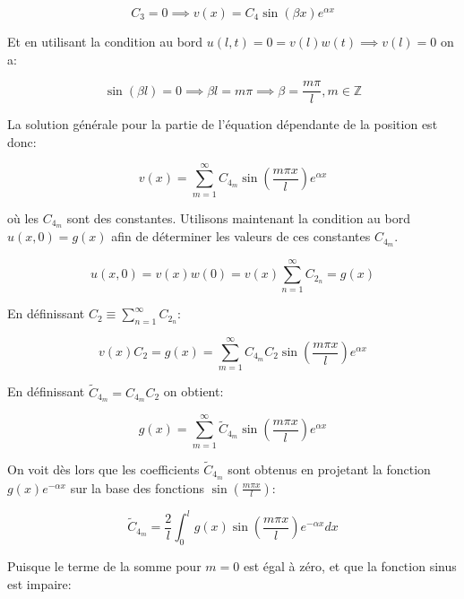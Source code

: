 \documentclass[a4paper, 12pt]{report}
\begin{document}
\begin{equation}
  C_3 = 0 \implies v(x) = C_4 \sin(\beta x) e^{\alpha x}
\end{equation}

Et en utilisant la condition au bord $u(l,t) = 0 = v(l) w(t) \implies v(l) = 0$ on a:

\begin{equation}
  \sin(\beta l) = 0 \implies \beta l = m \pi \implies \beta = \frac{m \pi}{l}, m \in \mathbb{Z}
\end{equation}

La solution générale pour la partie de l'équation dépendante de la position est
donc:

\begin{equation}
  \boxed{v(x) = \sum_{m=1}^{\infty} C_{4_m} \sin \left (\frac{m \pi x}{l} \right ) e^{\alpha x}}
\end{equation}

où les $C_{4_m}$ sont des constantes. Utilisons maintenant la condition au bord
$u(x,0) = g(x)$ afin de déterminer les valeurs de ces constantes $C_{4_m}$.

\begin{equation}
  u(x,0) = v(x) w(0) = v(x) \sum_{n=1}^{\infty} C_{2_n} = g(x)
\end{equation}

En définissant $C_2 \equiv \sum_{n=1}^{\infty} C_{2_n}$:

\begin{equation}
  v(x) C_{2} = g(x) = \sum_{m=1}^{\infty} C_{4_m}C_{2} \sin \left (\frac{m \pi x}{l} \right ) e^{\alpha x}
\end{equation}

En définissant $\tilde{C}_{4_m} = C_{4_m}C_{2}$ on obtient:

\begin{equation}
  g(x) = \sum_{m=1}^{\infty} \tilde{C}_{4_m} \sin \left (\frac{m \pi x}{l} \right ) e^{\alpha x}
\end{equation}

On voit dès lors que les coefficients $\tilde{C}_{4_m}$ sont obtenus
en projetant la fonction $g(x)e^{-\alpha x}$ sur la base des fonctions $\sin \left (\frac{m \pi x}{l} \right )$:

\begin{equation}
  \tilde{C}_{4_m} = \frac{2}{l} \int_0^l g(x) \sin \left (\frac{m \pi x}{l} \right ) e^{-\alpha x} dx
\end{equation}

Puisque le terme de la somme pour $m=0$ est égal à zéro, et que la fonction
sinus est impaire:
\end{document}
